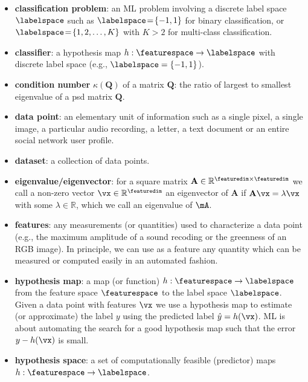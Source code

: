 \documentclass[12pt]{report}
\begin{document}
\begin{itemize}
\item {\bf classification problem}: an ML problem involving a discrete label space $\labelspace$ 
such as $\labelspace\!=\!\{-1,1\}$ for binary classification, or $\labelspace\!=\!\{1,2,\ldots,K\}$ 
with $K\!>\!2$ for multi-class classification. 

\item {\bf classifier}: a hypothesis map $h: \featurespace \rightarrow \labelspace$ with discrete 
label space (e.g., $\labelspace=\{-1,1\}$). 

\item {\bf condition number } $\kappa(\mathbf{Q})$ of a matrix $\mathbf{Q}$: the ratio of largest 
to smallest eigenvalue of a psd matrix $\mathbf{Q}$.

\item {\bf data point}: an elementary unit of information such as a single pixel, a single image, 
a particular audio recording, a letter, a text document or an entire social network user profile. 
\item {\bf dataset}: a collection of data points. 

\item {\bf eigenvalue/eigenvector}: for a square matrix $\mathbf{A} \in \mathbb{R}^{\featuredim \times \featuredim}$ 
we call a non-zero vector $\vx \in \mathbb{R}^{\featuredim}$ an eigenvector of $\mathbf{A}$ if $\mathbf{A} \vx = \lambda \vx$ 
with some $\lambda \in \mathbb{R}$, which we call an eigenvalue of $\mA$. 

\item {\bf features}: any measurements (or quantities) used to characterize a data point (e.g., the 
maximum amplitude of a sound recoding or the greenness of an RGB image). In principle, we 
can use as a feature any quantity which can be measured or computed easily in an automated fashion.  

\item {\bf hypothesis map}: a map (or function) $h: \featurespace \rightarrow \labelspace$ from the 
feature space $\featurespace$ to the label space $\labelspace$. Given a data point with features 
$\vx$ we use a hypothesis map to estimate (or approximate) the label $y$ using the predicted 
label $\hat{y} = h(\vx)$. ML is about automating the search for a good hypothesis 
map such that the error $y - h(\vx)$ is small. 

\item {\bf hypothesis space}: a set of computationally feasible (predictor) maps $h: \featurespace \rightarrow \labelspace$. 


\end{itemize}
\end{document}
